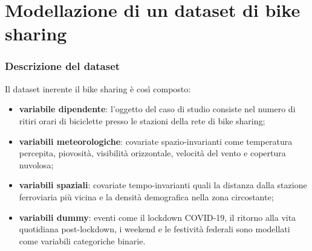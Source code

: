 \section[Modellazione di un dataset di bike sharing]{Modellazione di un dataset di bike sharing}
\begin{frame}
	\frametitle{Descrizione del dataset}
	
	Il dataset inerente il bike sharing è così composto:
	\begin{itemize}
		\justifying
		\item \textbf{variabile dipendente}: l'oggetto del caso di studio consiste nel numero di ritiri orari di biciclette presso le stazioni della rete di bike sharing;
		\item \textbf{variabili meteorologiche}: covariate spazio-invarianti come temperatura percepita, piovosità, visibilità orizzontale, velocità del vento e copertura nuvolosa;
		\item \textbf{variabili spaziali}: covariate tempo-invarianti quali la distanza dalla stazione ferroviaria più vicina e la densità demografica nella zona circostante;
		\item \textbf{variabili dummy}: eventi come il lockdown COVID-\num{19}, il ritorno alla vita quotidiana post-lockdown, i weekend e le festività federali sono modellati come variabili categoriche binarie.
	\end{itemize}	
\end{frame}
